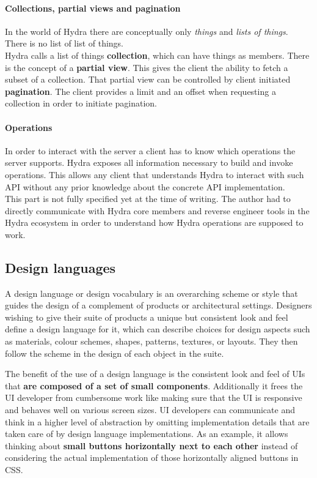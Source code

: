 \paragraph{Collections, partial views and pagination}
In the world of Hydra there are conceptually only \textit{things} and \textit{lists of things}. There is no list of list of things. \\
Hydra calls a list of things \textbf{collection}, which can have things as members. There is the concept of a \textbf{partial view}. This gives the client the ability to fetch a subset of a collection. That partial view can be controlled by client initiated \textbf{pagination}. The client provides a limit and an offset when requesting a collection in order to initiate pagination.

\paragraph{Operations}
In order to interact with the server a client has to know which operations the server supports. Hydra exposes all information necessary to build and invoke operations. This allows any client that understands Hydra to interact with such API without any prior knowledge about the concrete API implementation. \\
This part is not fully specified yet at the time of writing. The author had to directly communicate with Hydra core members and reverse engineer tools in the Hydra ecosystem in order to understand how Hydra operations are supposed to work.

\subsection{Design languages}
A design language or design vocabulary is an overarching scheme or style that guides the design of a complement of products or architectural settings. Designers wishing to give their suite of products a unique but consistent look and feel define a design language for it, which can describe choices for design aspects such as materials, colour schemes, shapes, patterns, textures, or layouts. They then follow the scheme in the design of each object in the suite. \citep{designlanguage}

The benefit of the use of a design language is the consistent look and feel of UIs that \textbf{are composed of a set of small components}. Additionally it frees the UI developer from cumbersome work like making sure that the UI is responsive and behaves well on various screen sizes. UI developers can communicate and think in a higher level of abstraction by omitting implementation details that are taken care of by design language implementations. As an example, it allows thinking about \textbf{small buttons horizontally next to each other} instead of considering the actual implementation of those horizontally aligned buttons in CSS.

